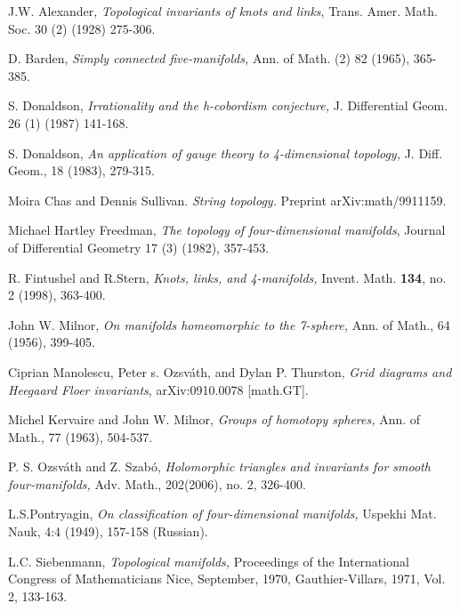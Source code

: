 \documentclass{article}
\begin{document}
\begin{thebibliography}{99}

  J.W. Alexander, {\it Topological invariants of knots and
links\/}, Trans. Amer. Math. Soc. 30 (2) (1928) 275-306.

 D. Barden, {\it Simply connected five-manifolds,\/} 
Ann. of Math. (2) 82 (1965), 365-385.

  S. Donaldson, {\it Irrationality and the h-cobordism 
conjecture,\/} J. Differential Geom. 26 (1) (1987) 141-168.

 S. Donaldson, {\it An application of gauge theory to 
4-dimensional topology,\/} J. Diff. Geom., 18 (1983), 279-315.

 Moira Chas and Dennis Sullivan. {\it String topology.\/} 
Preprint arXiv:math/9911159.

  Michael Hartley Freedman, {\it The topology of four-dimensional
manifolds\/}, Journal of Differential Geometry 17 (3)  (1982), 357-453.

  R. Fintushel and R.Stern, {\it Knots, links, and
4-manifolds,\/} Invent. Math. {\bf 134}, no. 2 (1998), 363-400.

 John W. Milnor, {\it On manifolds homeomorphic to the
7-sphere,\/}
Ann. of Math., 64 (1956), 399-405.

 Ciprian Manolescu, Peter s. Ozsv\'ath, and Dylan P. Thurston,
{\it Grid diagrams and Heegaard Floer invariants\/}, arXiv:0910.0078 [math.GT].


  Michel Kervaire and John W. Milnor, {\it Groups of homotopy
spheres,\/} Ann. of Math., 77 (1963), 504-537.

 P. S. Ozsv\'{a}th and Z.
Szab\'{o},  {\it Holomorphic triangles and 
invariants for smooth four-manifolds,\/}   Adv. Math., 202(2006), no. 2, 
326-400.

 L.S.Pontryagin, {\it On classification of four-dimensional
manifolds,\/} Uspekhi Mat. Nauk, 4:4 (1949), 157-158 (Russian).

 L.C. Siebenmann, {\it Topological manifolds,\/} 
Proceedings of the International Congress of Mathematicians
Nice, September, 1970, Gauthier-Villars,
1971, Vol. 2, 133-163.


\end{thebibliography}
\end{document}
